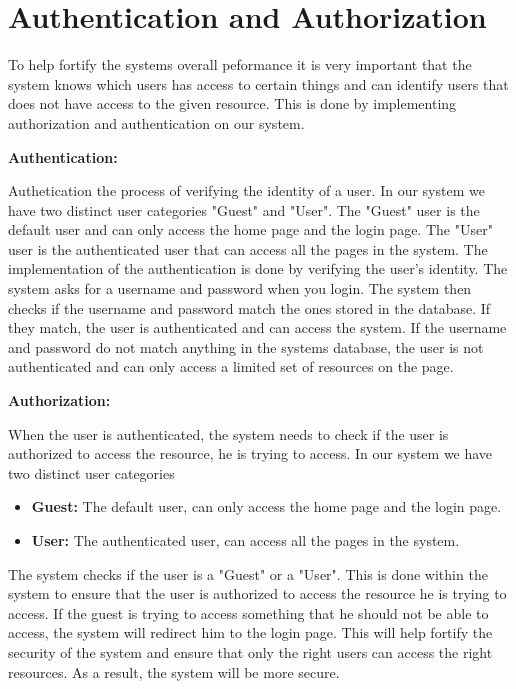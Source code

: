 \section{Authentication and Authorization}

To help fortify the systems overall peformance it is very
important that the system knows which users has
access to certain things and can identify users that does not have
access to the given resource. This is done by implementing authorization
and authentication on our system. \newline


\textbf{Authentication:} 

Authetication the process of verifying the
identity of a user. In our system we have two distinct
user categories "Guest" and "User". The "Guest" user
is the default user and can only access the home
page and the login page. The "User" user is the
authenticated user that can access all the pages in
the system.
The implementation of the authentication is done by
verifying the user's identity. The system asks for a
username and password when you login. The system
then checks if the username and password match the
ones stored in the database. If they match, the user
is authenticated and can access the system. If the
username and password do not match anything in
the systems database, the user is not authenticated
and can only access a limited set of resources on the
page. \newline

\textbf{Authorization:} 

When the user is authenticated,
the system needs to check if the user is authorized
to access the resource, he is trying to access. In
our system we have two distinct user categories
\begin{itemize}
    \item \textbf{Guest:} The default user, can only access the home page and the login page.
    \item \textbf{User:} The authenticated user, can access all the pages in the system.
\end{itemize}
The system checks if the
user is a "Guest" or a "User". This is done within
the system to ensure that the user is authorized to
access the resource he is trying to access. If the
guest is trying to access something that he should
not be able to access, the system will redirect him to
the login page. This will help fortify the security of
the system and ensure that only the right users can
access the right resources. As a result, the system
will be more secure.

